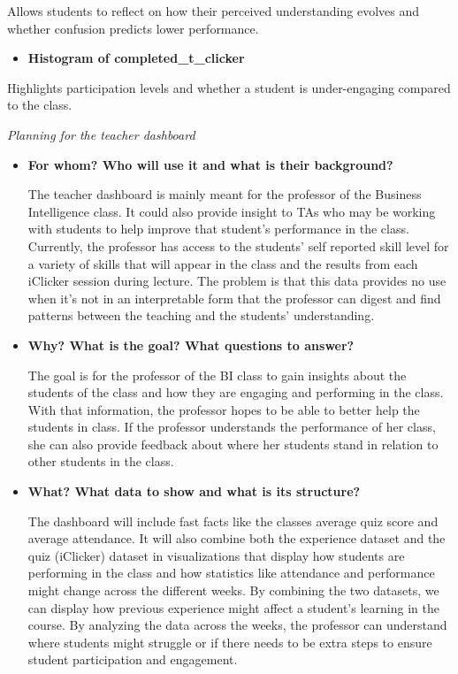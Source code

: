 \documentclass[
]{article}
\providecommand{\tightlist}{%
  \setlength{\itemsep}{0pt}\setlength{\parskip}{0pt}}
\begin{document}
Allows students to reflect on how their perceived understanding evolves
and whether confusion predicts lower performance.

\begin{itemize}
\tightlist
\item
  \textbf{Histogram of completed\_t\_clicker}
\end{itemize}

Highlights participation levels and whether a student is under-engaging
compared to the class.

\emph{Planning for the teacher dashboard}

\begin{itemize}
\item
  \textbf{For whom? Who will use it and what is their background?}

  The teacher dashboard is mainly meant for the professor of the
  Business Intelligence class. It could also provide insight to TAs who
  may be working with students to help improve that student's
  performance in the class. Currently, the professor has access to the
  students' self reported skill level for a variety of skills that will
  appear in the class and the results from each iClicker session during
  lecture. The problem is that this data provides no use when it's not
  in an interpretable form that the professor can digest and find
  patterns between the teaching and the students' understanding.
\item
  \textbf{Why? What is the goal? What questions to answer?}

  The goal is for the professor of the BI class to gain insights about
  the students of the class and how they are engaging and performing in
  the class. With that information, the professor hopes to be able to
  better help the students in class. If the professor understands the
  performance of her class, she can also provide feedback about where
  her students stand in relation to other students in the class.
\item
  \textbf{What? What data to show and what is its structure?}

  The dashboard will include fast facts like the classes average quiz
  score and average attendance. It will also combine both the experience
  dataset and the quiz (iClicker) dataset in visualizations that display
  how students are performing in the class and how statistics like
  attendance and performance might change across the different weeks. By
  combining the two datasets, we can display how previous experience
  might affect a student's learning in the course. By analyzing the data
  across the weeks, the professor can understand where students might
  struggle or if there needs to be extra steps to ensure student
  participation and engagement.


\end{itemize}
\end{document}
